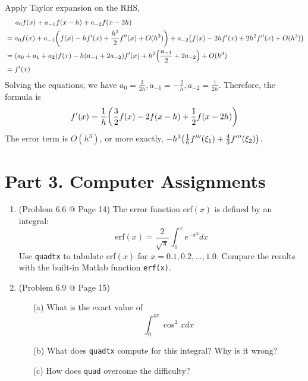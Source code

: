 \documentclass[10pt]{report}
\newcommand{\dintt}[4] {\int_{#1}^{#2} #3 d#4}
\DeclarePairedDelimiter\autoparen{(}{)}
\newcommand{\pa}[1]{\autoparen*{#1}}
\begin{document}
\begin{enumerate}
	Apply Taylor expansion on the RHS,
	\begin{align*}
		&\phantom{\ =\ } a_0 f(x) + a_{-1}f(x-h) + a_{-2}f(x-2h)\\
		&= a_0 f(x) + a_{-1} \pa{f(x) - hf'(x) + \frac{h^2}{2} f''(x) + O(h^3)} + a_{-2} \pa{f(x) - 2hf'(x) + 2h^2 f''(x) + O(h^3)}\\
		&= (a_0 + a_1 + a_2)f(x) - h(a_{-1} + 2a_{-2})f'(x) + h^2\pa{\frac{a_{-1}}{2} + 2a_{-2}} + O(h^3)\\
		&= f'(x)
	\end{align*}
	Solving the equations, we have $a_0 = \frac{3}{2h}, a_{-1} = -\frac{2}{h}, a_{-2} = \frac{1}{2h}$. Therefore, the formula is
	\[
	f'(x) = \frac{1}{h}\pa{\frac{3}{2} f(x) - 2f(x-h) + \frac{1}{2}f(x-2h)}
	\]
	The error term is $O(h^3)$, or more exactly, $-h^3\pa{\frac{1}{6}f'''(\xi_1) + \frac{4}{3}f'''(\xi_2)}$.
	
\end{enumerate}

\section*{Part 3. Computer Assignments}
\begin{enumerate}
	\item 
	(Problem 6.6 @ Page 14)  The error function erf$(x)$ is defined by an integral:
	\[
	\text{erf}(x) = \frac{2}{\sqrt{\pi}} \dintt{0}{x}{e^{-x^2}}{x}
	\]
	Use \texttt{quadtx} to tabulate erf$(x)$ for $x = 0.1, 0.2, . . . , 1.0$. Compare the results with the built-in Matlab function \texttt{erf(x)}.
	
	\item 
	(Problem 6.9 @ Page 15)
	\begin{enumerate}
		\item [(a)]
		What is the exact value of
		\[
		\dintt{0}{4\pi}{\cos^2 x}{x}
		\]
		
		\item [(b)]
		What does \texttt{quadtx} compute for this integral? Why is it wrong?
		
		\item [(c)]
		How does \texttt{quad} overcome the difficulty?
	\end{enumerate}
\end{enumerate}
\end{document}
